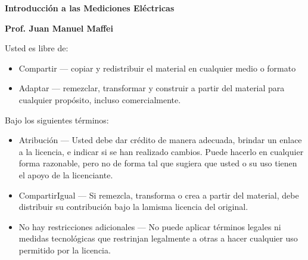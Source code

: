 \thispagestyle{empty}

\begin{center}

\vspace*{\fill}

\textbf{\color{verde_UnB}\fontsize{30pt}{35pt}\selectfont \textbf{Introducción a las Mediciones Eléctricas}}

\vfill

{\textbf{\fontsize{13pt}{15.6pt}\selectfont \centering  Prof. Juan Manuel Maffei}}



\vspace*{\fill}
\doclicenseThis

\end{center}
Usted es libre de:
\begin{itemize}
	\item Compartir — copiar y redistribuir el material en cualquier medio o formato
	\item Adaptar — remezclar, transformar y construir a partir del material para cualquier propósito, incluso comercialmente.
\end{itemize}

Bajo los siguientes términos:
\begin{itemize}
	\item Atribución — Usted debe dar crédito de manera adecuada, brindar un enlace a la licencia, e indicar si se han realizado cambios. Puede hacerlo en cualquier forma razonable, pero no de forma tal que sugiera que usted o su uso tienen el apoyo de la licenciante.
	\item CompartirIgual — Si remezcla, transforma o crea a partir del material, debe distribuir su contribución bajo la lamisma licencia del original.
	\item No hay restricciones adicionales — No puede aplicar términos legales ni medidas tecnológicas que restrinjan legalmente a otras a hacer cualquier uso permitido por la licencia.	
\end{itemize}

\newpage